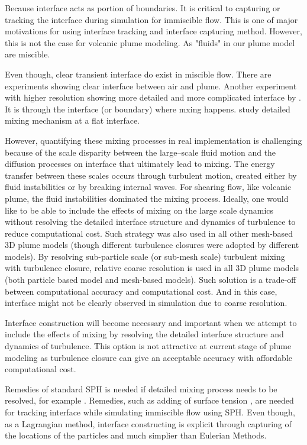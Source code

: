 \documentclass[10pt,a4paper]{article}
\begin{document}
Because interface acts as portion of boundaries.
It is critical to capturing or tracking the interface during simulation for immiscible flow. This is one of major motivations for using interface tracking and interface capturing method. However, this is not the case for volcanic plume modeling. As "fluids" in our plume model are miscible.
 
Even though, clear transient interface do exist in miscible flow. There are experiments \citep {papantoniou1989large} showing clear interface between air and plume. Another experiment with higher resolution showing more detailed and more complicated interface by \citet{crimaldi2001high}. 
It is through the interface (or boundary) where mxing happens. \citet{jacobson2008mixing} study detailed mixing mechanism at a flat interface.

However, quantifying these mixing processes in real implementation is challenging because of the scale disparity between the large–scale fluid motion and the diffusion processes on interface that ultimately lead to mixing. The energy transfer between these scales occurs through turbulent motion, created either by fluid instabilities or by breaking internal waves. For shearing flow, like volcanic plume, the fluid instabilities dominated the mixing process. Ideally, one would like to be able to include the effects of mixing on the large scale dynamics without resolving the detailed interface structure and dynamics of turbulence to reduce computational cost. Such strategy was also used in all other mesh-based 3D plume models (though different turbulence closures were adopted by different models). 
By resolving sub-particle scale (or sub-mesh scale) turbulent mixing with turbulence closure, relative coarse resolution is used in all 3D plume models (both particle based model and mesh-based models). Such solution is a trade-off between computational accuracy and computational cost. And in this case, interface might not be clearly observed in simulation due to coarse resolution. 

Interface construction will become necessary and important when we attempt to include the effects of mixing by resolving the detailed interface structure and dynamics of turbulence. This option is not attractive at current stage of plume modeling as turbulence closure can give an acceptable accuracy with affordable computational cost.
 
Remedies of standard SPH is needed if detailed mixing process needs to be resolved, for example \citep{cha2010kelvin, zhuimproved}.
Remedies, such as adding of surface tension \citep{behjati2017modelling}, are needed for tracking interface while simulating immiscible flow using SPH. Even though, as a Lagrangian method, interface constructing is explicit through capturing of the locations of the particles and much simplier than Eulerian Methods.
\end{document}
